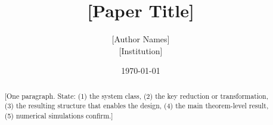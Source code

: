 \documentclass[11pt]{article}
\title{[Paper Title]}
\author{[Author Names]\\{}[Institution]}
\date{\today}
\begin{document}
\maketitle

\begin{abstract}
[One paragraph. State: (1) the system class, (2) the key reduction or
transformation, (3) the resulting structure that enables the design,
(4) the main theorem-level result, (5) numerical simulations confirm.]
\end{abstract}










\end{document}
